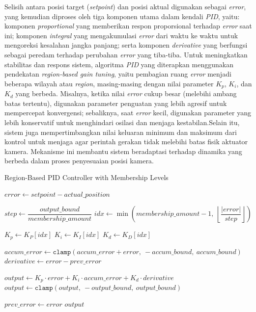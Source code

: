Selisih antara posisi target (\emph{setpoint}) dan posisi aktual digunakan sebagai \emph{error}, yang kemudian diproses oleh tiga komponen utama dalam kendali \emph{PID}, yaitu: komponen \emph{proportional} yang memberikan respon proporsional terhadap \emph{error} saat ini; komponen \emph{integral} yang mengakumulasi \emph{error} dari waktu ke waktu untuk mengoreksi kesalahan jangka panjang; serta komponen \emph{derivative} yang berfungsi sebagai peredam terhadap perubahan \emph{error} yang tiba-tiba. Untuk meningkatkan stabilitas dan respons sistem, algoritma \emph{PID} yang diterapkan menggunakan pendekatan \emph{region-based gain tuning}, yaitu pembagian ruang \emph{error} menjadi beberapa wilayah atau \emph{region}, masing-masing dengan nilai parameter $K_p$, $K_i$, dan $K_d$ yang berbeda. Misalnya, ketika nilai \emph{error} cukup besar (melebihi ambang batas tertentu), digunakan parameter penguatan yang lebih agresif untuk mempercepat konvergensi; sebaliknya, saat \emph{error} kecil, digunakan parameter yang lebih konservatif untuk menghindari osilasi dan menjaga kestabilan.Selain itu, sistem juga mempertimbangkan nilai keluaran minimum dan maksimum dari kontrol untuk menjaga agar perintah gerakan tidak melebihi batas fisik aktuator kamera. Mekanisme ini membantu sistem beradaptasi terhadap dinamika yang berbeda dalam proses penyesuaian posisi kamera.

\vspace{1ex}
\begin{algorithm}[H]
\caption{Region-Based PID Controller with Membership Levels}
\label{alg:region-pid}

$error \gets setpoint - actual\_position$\;

$step \gets \dfrac{output\_bound}{membership\_amount}$\;
$idx \gets \min(membership\_amount - 1,\ \left\lfloor \dfrac{|error|}{step} \right\rfloor)$\;

$K_p \gets K_P[idx]$\;
$K_i \gets K_I[idx]$\;
$K_d \gets K_D[idx]$\;

$accum\_error \gets \texttt{clamp}(accum\_error + error,\ -accum\_bound,\ accum\_bound)$\;
$derivative \gets error - prev\_error$\;

$output \gets K_p \cdot error + K_i \cdot accum\_error + K_d \cdot derivative$\;
$output \gets \texttt{clamp}(output,\ -output\_bound,\ output\_bound)$\;

$prev\_error \gets error$\;
\Return $output$\;
\end{algorithm}



